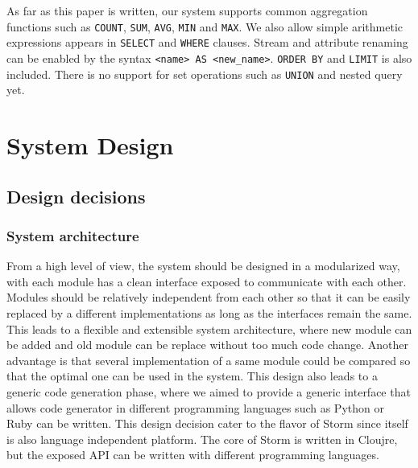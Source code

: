 \documentclass[conference, twocolumn, 11pt]{IEEEtran}
\theoremstyle{definition}
\begin{document}
As far as this paper is written, our system supports common aggregation functions such as \texttt{COUNT}, \texttt{SUM}, \texttt{AVG}, \texttt{MIN} and \texttt{MAX}. We also allow simple arithmetic expressions appears in \texttt{SELECT} and \texttt{WHERE} clauses. Stream and attribute renaming can be enabled by the syntax \texttt{<name> AS <new\_name>}. \texttt{ORDER BY} and \texttt{LIMIT} is also included. There is no support for set operations such as \texttt{UNION} and nested query yet.

\section{System Design}\label{sys-design}
\subsection{Design decisions}
\subsubsection{System architecture}
From a high level of view, the system should be designed in a modularized way, with each module has a clean interface exposed to communicate with each other. Modules should be relatively independent from each other so that it can be easily replaced by a different implementations as long as the interfaces remain the same. This leads to a flexible and extensible system architecture, where new module can be added and old module can be replace without too much code change. Another advantage is that several implementation of a same module could be compared so that the optimal one can be used in the system. This design also leads to a generic code generation phase, where we aimed to provide a generic interface that allows code generator in different programming languages such as Python or Ruby can be written. This design decision cater to the flavor of Storm since itself is also language independent platform. The core of Storm is written in Cloujre, but the exposed API can be written with different programming languages.
\end{document}
